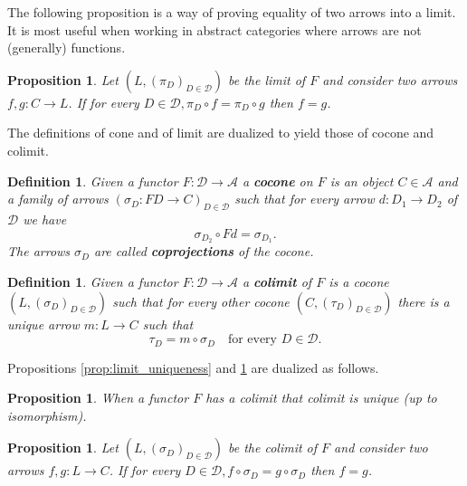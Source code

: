\documentclass[letterpaper, 11pt, oneside]{memoir}
\theoremstyle{myteo}
\newtheorem{proposition}[theorem]{Proposition}
\newtheorem{definition}[theorem]{Definition}
\numberwithin{equation}{section}
\newcommand{\marginnote}[1]{\marginpar{\footnotesize #1}}
\newcommand{\A}{\mathscr{A}}
\begin{document}
The following proposition is a way of proving equality of two arrows into a limit.
It is most useful when working in abstract categories where arrows are not (generally) functions.

\begin{proposition}
  \label{prop:arrows_into_limit}
  Let \((L, (\pi_D)_{D \in \mathscr{D}})\) be the limit of \(F\) and consider two arrows \(f,g \colon C \to L\).
  If for every \(D \in \mathscr{D}, \pi_D \circ f = \pi_D \circ g\) then \(f = g\).
\end{proposition}

The definitions of cone and of limit are dualized to yield those of cocone and colimit.

\begin{definition}
  Given a functor \(F \colon \mathscr{D} \to \A\) a \textbf{cocone} \marginnote{cocone} on \(F\) is an object \(C \in \A\) and a family of arrows \(\left(\sigma_D \colon FD \to C \right)_{D \in \mathscr{D}}\) such that for every arrow \(d \colon D_1 \to D_2\) of \(\mathscr{D}\) we have
  \begin{equation}
    \label{eq:cocone}
    \sigma_{D_2} \circ Fd = \sigma_{D_1}.
  \end{equation}
  The arrows \(\sigma_D\) are called \textbf{coprojections} of the cocone.
  \marginnote{coprojection}
\end{definition}

\begin{definition}
  Given a functor \(F \colon \mathscr{D} \to \A\) a \textbf{colimit} \marginnote{colimit} of \(F\) is a cocone \((L, (\sigma_D)_{D \in \mathscr{D}})\) such that for every other cocone \((C, (\tau_D)_{D \in \mathscr{D}})\) there is a unique arrow \(m \colon L \to C\) such that
  \begin{equation*}
    \tau_D = m \circ \sigma_D \quad \text{for every \(D \in \mathscr{D}\)}.
  \end{equation*}
\end{definition}

Propositions \ref{prop:limit_uniqueness} and \ref{prop:arrows_into_limit} are dualized as follows.

\begin{proposition}
  \label{prop:colimit_uniqueness}
  When a functor \(F\) has a colimit that colimit is unique (up to isomorphism).
\end{proposition}

\begin{proposition}
  \label{prop:arrows_from_colimit}
  Let \((L, (\sigma_D)_{D \in \mathscr{D}})\) be the colimit of \(F\) and consider two arrows \(f,g \colon L \to C\).
  If for every \(D \in \mathscr{D}, f \circ \sigma_D =  g \circ \sigma_D\) then \(f = g\).
\end{proposition}
\end{document}
